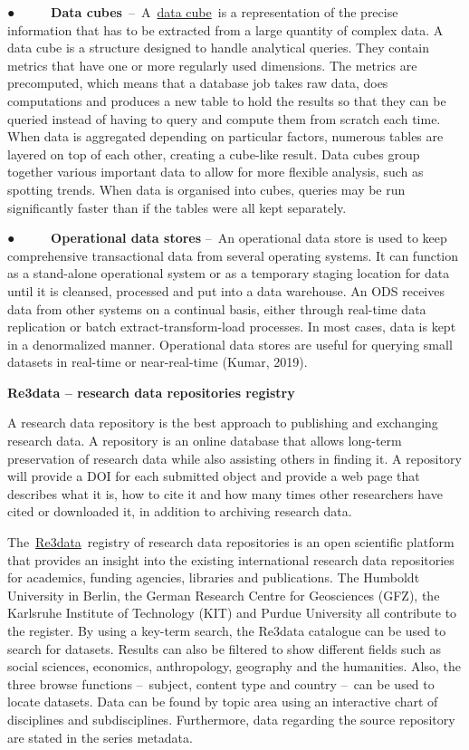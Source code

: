 \documentclass[
]{book}
\begin{document}
● ~ ~ ~ \textbf{Data cubes}~--~A~\href{https://www.metabase.com/learn/databases/data-cube}{}\href{https://www.metabase.com/learn/databases/data-cube}{data cube}~is a representation of the precise information that has to be extracted from a large quantity of complex data. A data cube is a structure designed to handle analytical queries. They contain metrics that have one or more regularly used dimensions. The metrics are precomputed, which means that a database job takes raw data, does computations and produces a new table to hold the results so that they can be queried instead of having to query and compute them from scratch each time. When data is aggregated depending on particular factors, numerous tables are layered on top of each other, creating a cube-like result. Data cubes group together various important data to allow for more flexible analysis, such as spotting trends. When data is organised into cubes, queries may be run significantly faster than if the tables were all kept separately.

● ~ ~ ~ \textbf{Operational data stores} --~An operational data store is used to keep comprehensive transactional data from several operating systems. It can function as a stand-alone operational system or as a temporary staging location for data until it is cleansed, processed and put into a data warehouse. An ODS receives data from other systems on a continual basis, either through real-time data replication or batch extract-transform-load processes. In most cases, data is kept in a denormalized manner. Operational data stores are useful for querying small datasets in real-time or near-real-time (Kumar, 2019).

\textbf{Re3data -- research data repositories registry}

A research data repository is the best approach to publishing and exchanging research data. A repository is an online database that allows long-term preservation of research data while also assisting others in finding it. A repository will provide a DOI for each submitted object and provide a web page that describes what it is, how to cite it and how many times other researchers have cited or downloaded it, in addition to archiving research data.

The~\href{https://www.re3data.org/}{}\href{https://www.re3data.org/}{Re3data}~registry of research data repositories is an open scientific platform that provides an insight into the existing international research data repositories for academics, funding agencies, libraries and publications. The Humboldt University in Berlin, the German Research Centre for Geosciences (GFZ), the Karlsruhe Institute of Technology (KIT) and Purdue University all contribute to the register. By using a key-term search, the Re3data catalogue can be used to search for datasets. Results can also be filtered to show different fields such as social sciences, economics, anthropology, geography and the humanities. Also, the three browse functions --~subject, content type and country --~can be used to locate datasets. Data can be found by topic area using an interactive chart of disciplines and subdisciplines. Furthermore, data regarding the source repository are stated in the series metadata.
\end{document}
